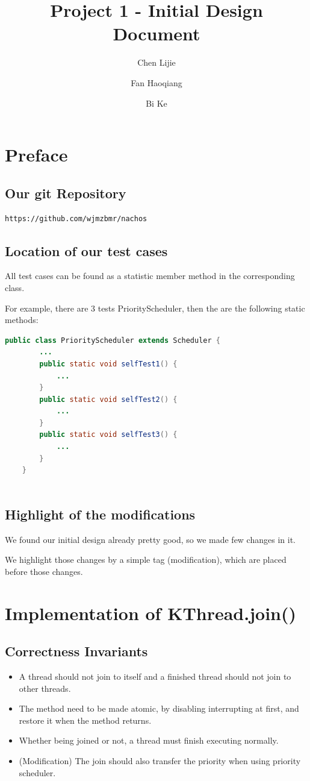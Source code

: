 \documentclass{article}
\title{Project 1 - Initial Design Document}
\author{Chen Lijie\\ \and
	Fan Haoqiang\\ \and
	Bi Ke\\ }
\date{}
\begin{document}
	\maketitle
	\tableofcontents
	\section{Preface}
	\subsection{Our git Repository}
	\texttt{https://github.com/wjmzbmr/nachos}
	
	\subsection{Location of our test cases}
	All test cases can be found as a statistic member method in the corresponding class.
	
	For example, there are 3 tests PriorityScheduler, then the are the following static methods:
	
	\begin{lstlisting}[language=java]
	public class PriorityScheduler extends Scheduler {
	    ...
	    public static void selfTest1() {
	        ...
	    }
	    public static void selfTest2() {
	        ...
	    }
	    public static void selfTest3() {
	        ...
	    }
	}
	
	\end{lstlisting}
	\subsection{Highlight of the modifications}
	We found our initial design already pretty good, so we made few changes in it.
	
	We highlight those changes by a simple tag (modification), which are placed before those changes.
	
	\newpage
	\section{Implementation of KThread.join()}
	
	\subsection{Correctness Invariants}
	
	\begin{itemize}
		\item A thread should not join to itself and a finished thread should not join to other threads.
		\item The method need to be made atomic, by disabling interrupting at first, and restore it when the method returns.
		\item Whether being joined or not, a thread must finish executing normally.
		\item(Modification) The join should also transfer the priority when using priority scheduler.
	\end{itemize}
\end{document}
